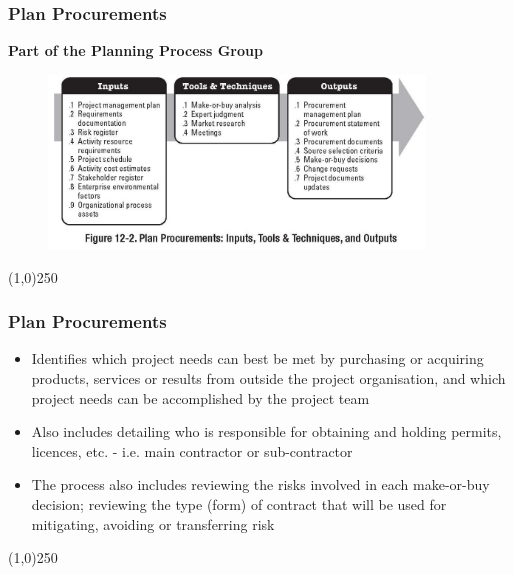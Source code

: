 \begin{frame}
\frametitle{Plan Procurements}
\textbf{Part of the Planning Process Group}
\begin{figure}
	\centering
		\includegraphics[width = 10cm]{images/Fig12-2.jpg}
	\label{fig:12-2}
\end{figure}
\end{frame}\begin{center}\line(1,0){250}\end{center}



\begin{frame}
\frametitle{Plan Procurements}
\begin{itemize}
	\item Identifies which project needs can best be met by purchasing or acquiring products, services or results from outside the project organisation, and which project needs can be accomplished by the project team
	\item Also includes detailing who is responsible for obtaining and holding permits, licences, etc. - i.e. main contractor or sub-contractor
	\item The process also includes reviewing the risks involved in each make-or-buy decision; reviewing the type (form) of contract that will be used for mitigating, avoiding or transferring risk
\end{itemize}
\end{frame}\begin{center}\line(1,0){250}\end{center}




